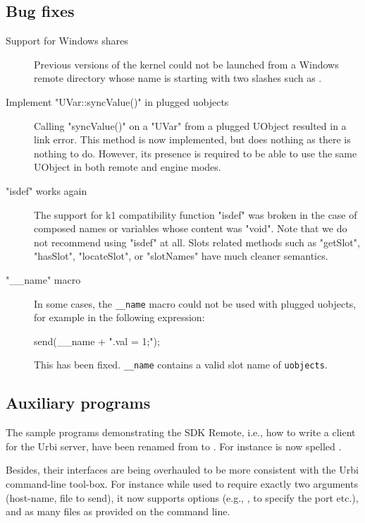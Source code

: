 \subsection{Bug fixes}
\begin{description}
\item[Support for Windows shares]

  Previous versions of the kernel could not be launched from a Windows
  remote directory whose name is starting with two slashes such as
  .

\item[Implement "UVar::syncValue()" in plugged uobjects]

Calling "syncValue()" on a "UVar" from a plugged UObject resulted in a
link error.  This method is now implemented, but does nothing as there
is nothing to do. However, its presence is required to be able to use
the same UObject in both remote and engine modes.

\item["isdef" works again]

The support for k1 compatibility function "isdef" was broken in the
case of composed names or variables whose content was "void". Note
that we do not recommend using "isdef" at all. Slots related methods
such as "getSlot", "hasSlot", "locateSlot", or "slotNames" have much
cleaner semantics.

\item["\_\_name" macro]

  In some cases, the \lstinline|__name| macro could not be used with
  plugged uobjects, for example in the following expression:

\begin{urbiunchecked}
send(__name + ".val = 1;");
\end{urbiunchecked}
  \noindent
  This has been fixed. \lstinline|__name| contains a valid slot name
  of \lstinline|uobjects|.
\end{description}

\subsection{Auxiliary programs}

The sample programs demonstrating the SDK Remote, i.e., how to write a
client for the Urbi server, have been renamed from  to
.  For instance  is now spelled
.

Besides, their interfaces are being overhauled to be more consistent with
the Urbi command-line tool-box.  For instance while  used
to require exactly two arguments (host-name, file to send), it now supports
options (e.g., ,  to specify the port etc.),
and as many files as provided on the command line.



